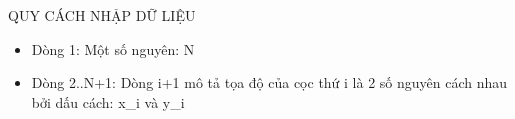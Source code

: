 QUY CÁCH NHẬP DỮ LIỆU
\begin{itemize}
	\item     Dòng 1: Một số nguyên: N   
	\item     Dòng 2..N+1: Dòng i+1 mô tả tọa độ của cọc thứ i là 2 số nguyên         cách nhau bởi dấu cách: x\_i và y\_i   
\end{itemize}